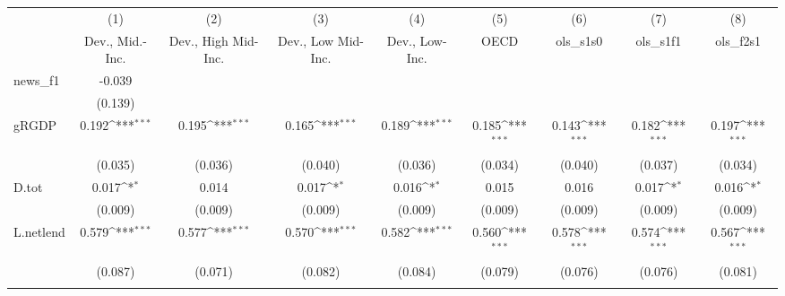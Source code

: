 {
\def\sym#1{\ifmmode^{#1}\else\(^{#1}\)\fi}
\begin{tabular}{l*{8}{c}}
\toprule
            &\multicolumn{1}{c}{(1)}&\multicolumn{1}{c}{(2)}&\multicolumn{1}{c}{(3)}&\multicolumn{1}{c}{(4)}&\multicolumn{1}{c}{(5)}&\multicolumn{1}{c}{(6)}&\multicolumn{1}{c}{(7)}&\multicolumn{1}{c}{(8)}\\
            &\multicolumn{1}{c}{Dev., Mid.-Inc.}&\multicolumn{1}{c}{Dev., High Mid-Inc.}&\multicolumn{1}{c}{Dev., Low Mid-Inc.}&\multicolumn{1}{c}{Dev., Low-Inc.}&\multicolumn{1}{c}{OECD}&\multicolumn{1}{c}{ols\_s1s0}&\multicolumn{1}{c}{ols\_s1f1}&\multicolumn{1}{c}{ols\_f2s1}\\
\midrule
news\_f1     &      -0.039         &                     &                     &                     &                     &                     &                     &                     \\
            &     (0.139)         &                     &                     &                     &                     &                     &                     &                     \\
\addlinespace
gRGDP       &       0.192\sym{***}&       0.195\sym{***}&       0.165\sym{***}&       0.189\sym{***}&       0.185\sym{***}&       0.143\sym{***}&       0.182\sym{***}&       0.197\sym{***}\\
            &     (0.035)         &     (0.036)         &     (0.040)         &     (0.036)         &     (0.034)         &     (0.040)         &     (0.037)         &     (0.034)         \\
\addlinespace
D.tot       &       0.017\sym{*}  &       0.014         &       0.017\sym{*}  &       0.016\sym{*}  &       0.015         &       0.016         &       0.017\sym{*}  &       0.016\sym{*}  \\
            &     (0.009)         &     (0.009)         &     (0.009)         &     (0.009)         &     (0.009)         &     (0.009)         &     (0.009)         &     (0.009)         \\
\addlinespace
L.netlend   &       0.579\sym{***}&       0.577\sym{***}&       0.570\sym{***}&       0.582\sym{***}&       0.560\sym{***}&       0.578\sym{***}&       0.574\sym{***}&       0.567\sym{***}\\
            &     (0.087)         &     (0.071)         &     (0.082)         &     (0.084)         &     (0.079)         &     (0.076)         &     (0.076)         &     (0.081)         \\
\addlinespace

\end{tabular}}
